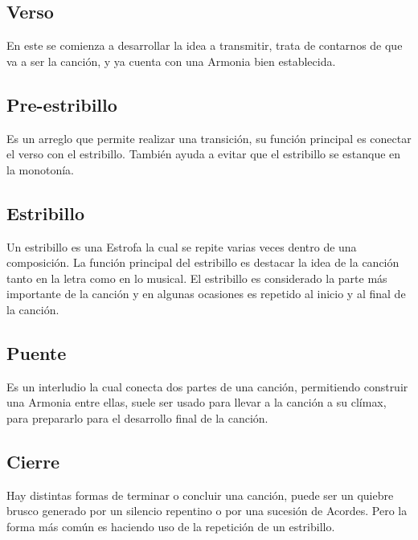 \documentclass[12pt, a4paper, titlepage]{report}
\begin{document}
			\subsection{Verso}
			En este se comienza a desarrollar la idea a transmitir, trata de contarnos de que va a ser la canción, y ya cuenta con una \Gls{Armonia}  bien establecida.\par
			\subsection{Pre-estribillo}
			Es un arreglo que permite realizar una transición, su función principal es conectar el verso con el estribillo. También ayuda a evitar que el estribillo se estanque en la monotonía.\par
			\subsection{Estribillo}
			Un estribillo es una \Gls{Estrofa} la cual se repite varias veces dentro de una composición. La función principal del estribillo es destacar la idea de la canción tanto en la letra como en lo musical. El estribillo es considerado la parte más importante de la canción y en algunas ocasiones es repetido al inicio y al final de la canción.\par
			\subsection{Puente}
			Es un interludio la cual conecta dos partes de una canción, permitiendo construir una \Gls{Armonia}  entre ellas, suele ser usado para llevar a la canción a su clímax, para prepararlo para el desarrollo final de la canción.\par
			\subsection{Cierre}
			Hay distintas formas de terminar o concluir una canción, puede ser un quiebre brusco generado por un silencio repentino o por una sucesión de \Gls{Acordes}. Pero la forma más común es haciendo uso de la repetición de un estribillo.\par
\end{document}
